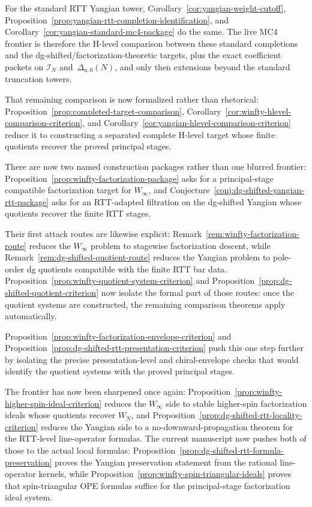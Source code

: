 \begin{remark}
For the standard RTT Yangian tower,
Corollary~\ref{cor:yangian-weight-cutoff},
Proposition~\ref{prop:yangian-rtt-completion-identification}, and
Corollary~\ref{cor:yangian-standard-mc4-package} do the same.
The live MC4 frontier is therefore the H-level comparison between these
standard completions and the dg-shifted/factorization-theoretic targets,
plus the exact coefficient packets on
$\mathcal{I}_N$ and~$\Delta_{a,0}(N)$, and only then extensions beyond
the standard truncation towers.

That remaining comparison is now formalized rather than rhetorical:
Proposition~\ref{prop:completed-target-comparison},
Corollary~\ref{cor:winfty-hlevel-comparison-criterion}, and
Corollary~\ref{cor:yangian-hlevel-comparison-criterion} reduce it to
constructing a separated complete H-level target whose finite quotients
recover the proved principal stages.

There are now two named construction packages rather than one blurred
frontier: Proposition~\ref{prop:winfty-factorization-package} asks for a
principal-stage compatible factorization target for $W_\infty$, and
Conjecture~\ref{conj:dg-shifted-yangian-rtt-package} asks for an
RTT-adapted filtration on the dg-shifted Yangian whose quotients recover
the finite RTT stages.

Their first attack routes are likewise explicit:
Remark~\ref{rem:winfty-factorization-route} reduces the
$W_\infty$ problem to stagewise factorization descent, while
Remark~\ref{rem:dg-shifted-quotient-route} reduces the Yangian problem
to pole-order dg quotients compatible with the finite RTT bar data.
Proposition~\ref{prop:winfty-quotient-system-criterion} and
Proposition~\ref{prop:dg-shifted-quotient-criterion} now isolate the
formal part of those routes: once the quotient systems are constructed,
the remaining comparison theorems apply automatically.

Proposition~\ref{prop:winfty-factorization-envelope-criterion} and
Proposition~\ref{prop:dg-shifted-rtt-presentation-criterion} push this
one step further by isolating the precise presentation-level and
chiral-envelope checks that would identify the quotient systems with the
proved principal stages.

The frontier has now been sharpened once again:
Proposition~\ref{prop:winfty-higher-spin-ideal-criterion} reduces the
$W_\infty$ side to stable higher-spin factorization ideals whose
quotients recover $W_N$, and
Proposition~\ref{prop:dg-shifted-rtt-locality-criterion} reduces the
Yangian side to a no-downward-propagation theorem for the RTT-level
line-operator formulas.  The current manuscript now pushes both of
those to the actual local formulas:
Proposition~\ref{prop:dg-shifted-rtt-formula-preservation} proves the
Yangian preservation statement from the rational line-operator kernels,
while Proposition~\ref{prop:winfty-spin-triangular-ideals} proves that
spin-triangular OPE formulas suffice for the principal-stage
factorization ideal system.


\end{remark}
